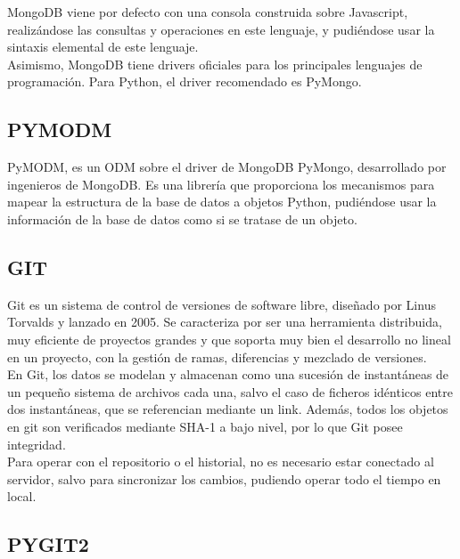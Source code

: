 MongoDB viene por defecto con una consola construida sobre Javascript, realizándose las consultas y operaciones en este lenguaje, y pudiéndose usar la sintaxis elemental de este lenguaje.\\


Asimismo, MongoDB tiene drivers oficiales para los principales lenguajes de programación. Para Python, el driver recomendado es PyMongo.\\


\subsection{PYMODM} 
\label{sec:pymod}

PyMODM, es un ODM sobre el driver de MongoDB PyMongo, desarrollado por ingenieros de MongoDB. Es una librería que proporciona los mecanismos para mapear la estructura de la base de datos a objetos Python, pudiéndose usar la información de la base de datos como si se tratase de un objeto.\\


\subsection{GIT} 
\label{sec:git}

Git es un sistema de control de versiones de software libre, diseñado por Linus Torvalds y lanzado en 2005. Se caracteriza por ser una herramienta distribuida, muy eficiente de proyectos grandes y que soporta muy bien el desarrollo no lineal en un proyecto, con la gestión de ramas, diferencias y mezclado de versiones.\\


En Git, los datos se modelan y almacenan como una sucesión de instantáneas de un pequeño sistema de archivos cada una, salvo el caso de ficheros idénticos entre dos instantáneas, que se referencian mediante un link. Además, todos los objetos en git son verificados mediante SHA-1 a bajo nivel, por lo que Git posee integridad.\\


Para operar con el repositorio o el historial, no es necesario  estar conectado al servidor, salvo para sincronizar los cambios, pudiendo operar todo el tiempo en local.\\


\subsection{PYGIT2} 
\label{sec:pygit2}

